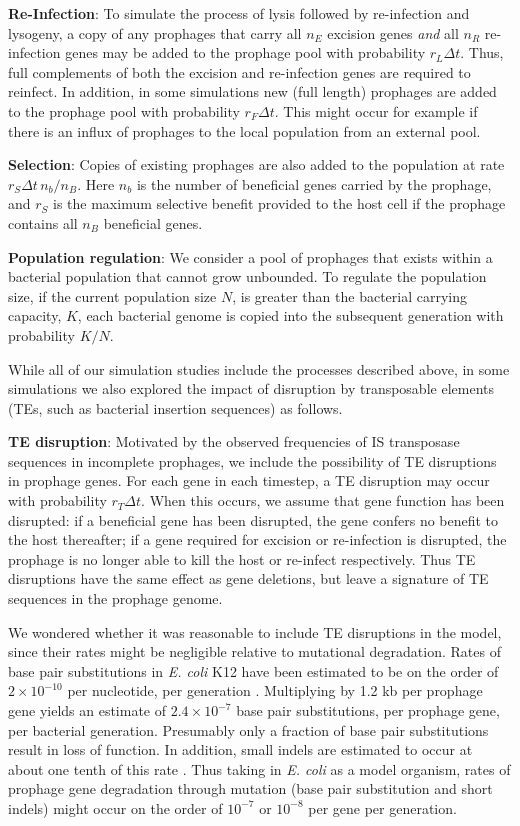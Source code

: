 {\bf Re-Infection}:  To simulate the process of lysis followed by re-infection and lysogeny, a copy of any prophages that carry all $n_E$ excision genes \emph{and} all $n_R$ re-infection genes may be added to the prophage pool with probability $r_L \Delta t$.
Thus, full complements of both the excision and re-infection genes are required to reinfect.
In addition, in some simulations new (full length) prophages are added to the prophage pool with probability $r_F \Delta t$.  This might occur for example if there is an influx of prophages to the local population from an external pool.
    
{\bf Selection}: Copies of existing prophages are also added to the population at rate $r_S \Delta t\,n_b/n_B$.  Here $n_b$ is the number of beneficial genes carried by the prophage, and $r_S$ is the maximum selective benefit provided to the host cell if the prophage contains all $n_B$ beneficial genes. 

{\bf Population regulation}: We consider a pool of prophages that exists within a bacterial population that cannot grow unbounded.  To regulate the population size, if the current population size $N$, is greater than the bacterial carrying capacity, $K$, each bacterial genome is copied into the subsequent generation with probability $K/N$.
    
While all of our simulation studies include the processes described above, in some simulations we also explored the impact of disruption by transposable elements (TEs, such as bacterial insertion sequences) as follows.

{\bf TE disruption}: Motivated by the observed frequencies of IS transposase sequences in incomplete prophages, we include the possibility of TE disruptions in prophage genes.  For each gene in each timestep, a TE disruption may occur with probability $r_T \Delta t$.  When this occurs, we assume that gene function has been disrupted: if a beneficial gene has been disrupted, the gene confers no benefit to the host thereafter; if a gene required for excision or re-infection is disrupted, the prophage is no longer able to kill the host or re-infect respectively.  Thus TE disruptions have the same effect as gene deletions, but leave a signature of TE sequences in the prophage genome.  

We wondered whether it was reasonable to include TE disruptions in the model, since their rates might be negligible relative to mutational degradation. Rates of base pair substitutions in {\it E. coli} K12 have been estimated to be on the order of $2\times10^{-10}$ per nucleotide, per generation \cite{foster_determinants_2015}.  Multiplying by 1.2 kb per prophage gene \cite{khan_quantifying_2019} yields an estimate of $2.4\times10^{-7}$ base pair substitutions, per prophage gene, per bacterial generation.  Presumably only a fraction of base pair substitutions result in loss of function.  In addition, small indels are estimated to occur at about one tenth of this rate \cite{foster_determinants_2015}.  Thus taking in {\it E. coli} as a model organism, rates of prophage gene degradation through mutation (base pair substitution and short indels) might occur on the order of $10^{-7}$ or $10^{-8}$ per gene per generation.

